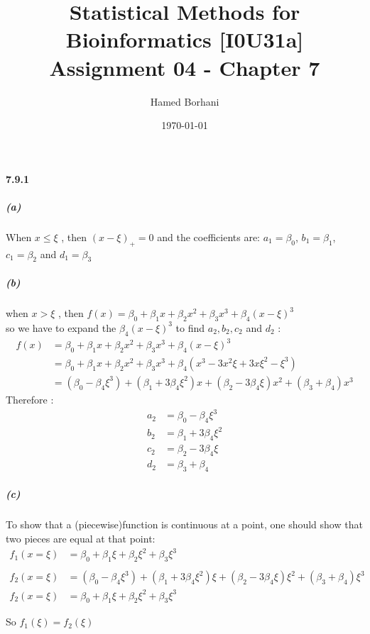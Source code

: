\documentclass[11pt]{article}
\title{\textbf{Statistical Methods for Bioinformatics [I0U31a] \\Assignment 04 - Chapter 7}}
\author{Hamed Borhani}
\date{\today}
\begin{document}
\lstset{language=R, breaklines=true, basicstyle=\footnotesize} 

\maketitle

\newpage
\paragraph{7.9.1 }

\subparagraph{(a)}
When $x\leq\xi$ , then $(x - \xi)_{+} = 0$ and the coefficients are: $a_{1} = \beta_{0}$, $b_{1} = \beta_{1}$, $c_{1} = \beta_{2}$ and $d_{1} = \beta_{3}$

\subparagraph{(b)}
when $x>\xi$ , then $f(x) = \beta_0 + \beta_1x + \beta_2x^2 + \beta_3x^3 + \beta_4(x-\xi)^3$
\\so we have to expand the $\beta_4(x-\xi)^3$ to find $a_2, b_2, c_2$ and $d_2$ :
\begin{align*}
f(x) &= \beta_0 + \beta_1x + \beta_2x^2 + \beta_3x^3 + \beta_4(x-\xi)^3
\\&= \beta_0 + \beta_1x + \beta_2x^2 + \beta_3x^3 + \beta_4(x^3 - 3x^2\xi + 3x\xi^2 - \xi^3)
\\&= (\beta_0 -\beta_4\xi^3) + (\beta_1 + 3\beta_4\xi^2)x + (\beta_2 - 3\beta_4\xi)x^2 + (\beta_3 + \beta_4)x^3
\end{align*}
Therefore :
\begin{align*}
a_2 &= \beta_0 -\beta_4\xi^3
\\b_2 &= \beta_1 + 3\beta_4\xi^2
\\c_2 &= \beta_2 - 3\beta_4\xi
\\d_2 &= \beta_3 + \beta_4
\end{align*}

\subparagraph{(c)}
To show that a (piecewise)function is continuous at a point, one should show that two pieces are equal at that point:
\begin{align*}
f_1(x = \xi) &= \beta_0 + \beta_1\xi + \beta_2\xi^2 + \beta_3\xi^3\\\\
f_2(x = \xi) &= (\beta_0 -\beta_4\xi^3) + (\beta_1 + 3\beta_4\xi^2)\xi + (\beta_2 - 3\beta_4\xi)\xi^2 + (\beta_3 + \beta_4)\xi^3\\
f_2(x = \xi) &= \beta_0 + \beta_1\xi + \beta_2\xi^2 + \beta_3\xi^3
\end{align*}
\begin{center}
So $f_1(\xi) = f_2(\xi)$
\end{center}
\end{document}
